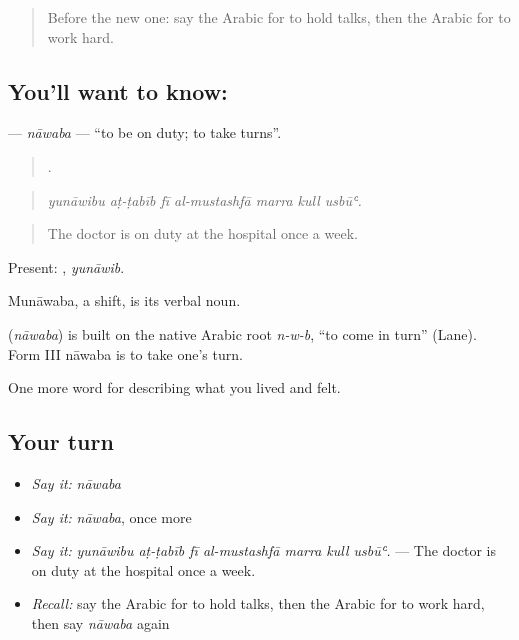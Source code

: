 \label{lesson:AR-C524-nawaba}



\begin{quote}
Before the new one: say the Arabic for to hold talks, then the Arabic for to work hard.
\end{quote}

\subsection*{You'll want to know: }
\textbf{} — \emph{nāwaba} — \textquotedblleft{}to be on duty; to take turns\textquotedblright{}.

\begin{quote}
      .
\end{quote}

\begin{quote}
\emph{yunāwibu aṭ-ṭabīb fī al-mustashfā marra kull usbūʿ.}
\end{quote}

\begin{quote}
The doctor is on duty at the hospital once a week.
\end{quote}

Present: , \emph{yunāwib}.

Munāwaba, a shift, is its verbal noun.

\begin{cousinweb}
\textbf{} (\emph{nāwaba}) is built on the native Arabic root \emph{n-w-b}, \textquotedblleft{}to come in turn\textquotedblright{} (Lane). Form III nāwaba is to take one's turn.
\end{cousinweb}

\begin{grammarlens}[title={What you've built}]
One more word for describing what you lived and felt.
\end{grammarlens}

\subsection*{Your turn}
\begin{itemize}
\raggedright
  \item \emph{Say it:} \emph{nāwaba}
  \item \emph{Say it:} \emph{nāwaba}, once more
  \item \emph{Say it:} \emph{yunāwibu aṭ-ṭabīb fī al-mustashfā marra kull usbūʿ.} — The doctor is on duty at the hospital once a week.
  \item \emph{Recall:} say the Arabic for to hold talks, then the Arabic for to work hard, then say \emph{nāwaba} again
\end{itemize}

